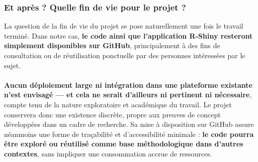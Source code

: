 \documentclass[12pt]{article}
\begin{document}
\subsubsection*{Et après ? Quelle fin de vie pour le projet ?}
La question de la fin de vie du projet se pose naturellement une fois le travail terminé. Dans notre cas, \textbf{le code ainsi que l’application R-Shiny resteront simplement disponibles sur GitHub}, principalement à des fins de consultation ou de réutilisation ponctuelle par des personnes intéressées par le sujet.\\
\\
\textbf{Aucun déploiement large ni intégration dans une plateforme existante n’est envisagé — et cela ne serait d’ailleurs ni pertinent ni nécessaire}, compte tenu de la nature exploratoire et académique du travail. Le projet conservera donc une existence discrète, propre aux preuves de concept développées dans un cadre de recherche. Sa mise à disposition sur GitHub assure néanmoins une forme de traçabilité et d’accessibilité minimale : \textbf{le code pourra être exploré ou réutilisé comme base méthodologique dans d’autres contextes}, sans impliquer une consommation accrue de ressources.
\end{document}
